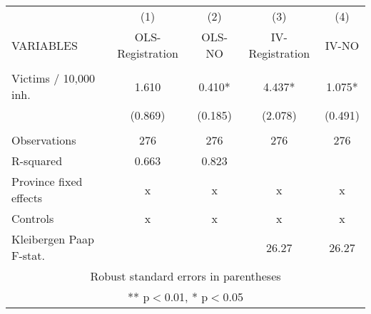 \begin{tabular}{lcccc} \hline
 & (1) & (2) & (3) & (4) \\
VARIABLES & OLS-Registration & OLS-NO & IV-Registration & IV-NO \\ \hline
 &  &  &  &  \\
Victims / 10,000 inh. & 1.610 & 0.410* & 4.437* & 1.075* \\
 & (0.869) & (0.185) & (2.078) & (0.491) \\
 &  &  &  &  \\
Observations & 276 & 276 & 276 & 276 \\
R-squared & 0.663 & 0.823 &  &  \\
Province fixed effects & x & x & x & x \\
Controls & x & x & x & x \\
 Kleibergen Paap F-stat. &  &  & 26.27 & 26.27 \\ \hline
\multicolumn{5}{c}{ Robust standard errors in parentheses} \\
\multicolumn{5}{c}{ ** p$<$0.01, * p$<$0.05} \\
\end{tabular}
